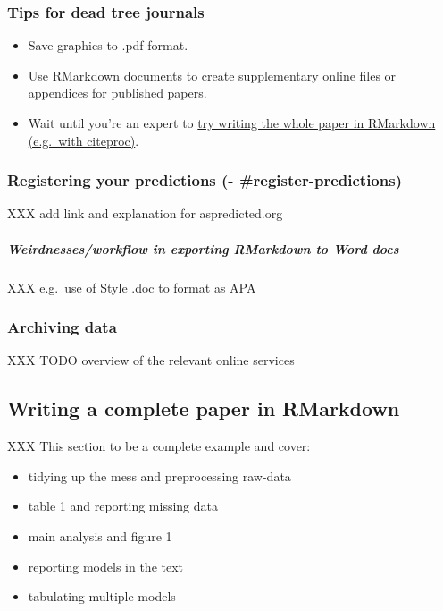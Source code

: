 \documentclass[]{article}
\providecommand{\tightlist}{%
  \setlength{\itemsep}{0pt}\setlength{\parskip}{0pt}}
\let\oldsubparagraph\subparagraph
\renewcommand{\subparagraph}[1]{\oldsubparagraph{#1}\mbox{}}
\theoremstyle{definition}
\theoremstyle{definition}
\theoremstyle{definition}
\theoremstyle{remark}
\begin{document}
\subsubsection*{Tips for dead tree journals}\label{publication}

\begin{itemize}
\item
  Save graphics to .pdf format.
\item
  Use RMarkdown documents to create supplementary online files or
  appendices for published papers.
\item
  Wait until you're an expert to
  \href{https://kieranhealy.org/blog/archives/2014/01/23/plain-text/}{try
  writing the whole paper in RMarkdown (e.g.~with citeproc)}.
\end{itemize}

\subsubsection{Registering your predictions (-
\#register-predictions)}\label{registering-your-predictions---register-predictions}

XXX add link and explanation for aspredicted.org

\subparagraph{Weirdnesses/workflow in exporting RMarkdown to Word
docs}\label{weirdnessesworkflow-in-exporting-rmarkdown-to-word-docs}

XXX e.g.~use of Style .doc to format as APA

\subsubsection*{Archiving data}\label{archiving-data}

XXX TODO overview of the relevant online services

\subsection{Writing a complete paper in RMarkdown}\label{writing-paper}

XXX This section to be a complete example and cover:

\begin{itemize}
\tightlist
\item
  tidying up the mess and preprocessing raw-data
\item
  table 1 and reporting missing data
\item
  main analysis and figure 1
\item
  reporting models in the text
\item
  tabulating multiple models
\end{itemize}
\end{document}
